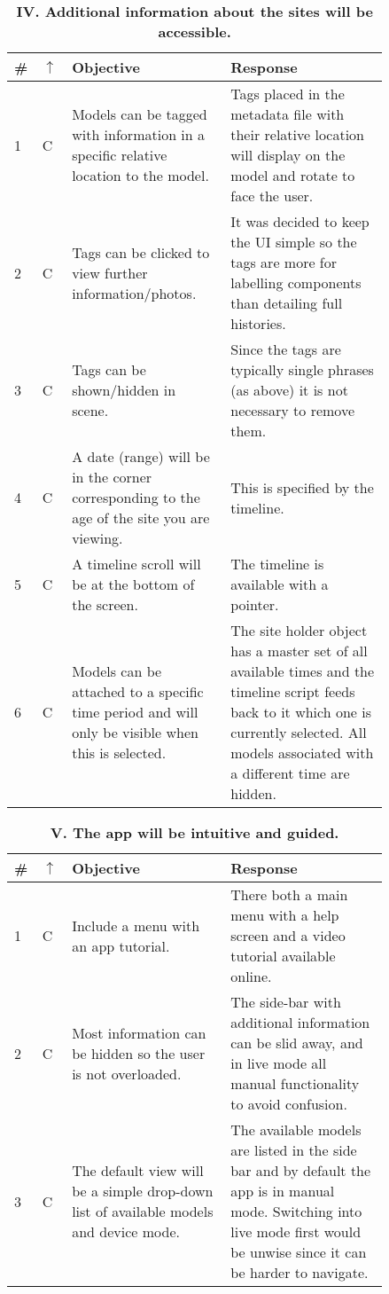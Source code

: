 \documentclass[12pt, a4paper]{article}
\newcommand{\done}[1]{\textcolor{brycedoesntlikegrey}{#1}}
\begin{document}
\newpage
\begin{table}[H]
\caption{\textbf{IV. Additional information about the sites will be accessible.}}
\begin{tabular}{| p{0.02\linewidth} | p{0.02\linewidth} | p{0.4\linewidth} | p{0.4\linewidth} | }
\hline
\textbf{\#} & \textbf{$\uparrow$} & \textbf{Objective} & \textbf{Response}
\\ \hline
1 & C & \done{Models can be tagged with information in a specific relative location to the model.} & Tags placed in the metadata file with their relative location will display on the model and rotate to face the user. \\ \hline
2 & C & Tags can be clicked to view further information/photos. & It was decided to keep the UI simple so the tags are more for labelling components than detailing full histories. \\ \hline
3 & C & Tags can be shown/hidden in scene. & Since the tags are typically single phrases (as above) it is not necessary to remove them. \\ \hline
4 & C & \done{A date (range) will be in the corner corresponding to the age of the site you are viewing.} & This is specified by the timeline. \\ \hline
5 & C & \done{A timeline scroll will be at the bottom of the screen.} & The timeline is available with a pointer. \\ \hline
6 & C & \done{Models can be attached to a specific time period and will only be visible when this is selected.} & The site holder object has a master set of all available times and the timeline script feeds back to it which one is currently selected. All models associated with a different time are hidden. \\ \hline
\end{tabular}
\label{table:obj4}
\end{table}

\begin{table}[H]
\caption{\textbf{V. The app will be intuitive and guided.}}
\begin{tabular}{| p{0.02\linewidth} | p{0.02\linewidth} | p{0.4\linewidth} | p{0.4\linewidth} | }
\hline
\textbf{\#} & \textbf{$\uparrow$} & \textbf{Objective} & \textbf{Response}
\\ \hline
1 & C & \done{Include a menu with an app tutorial.} & There both a main menu with a help screen and a video tutorial available online. \\ \hline
2 & C & \done{Most information can be hidden so the user is not overloaded.} & The side-bar with additional information can be slid away, and in live mode all manual functionality to avoid confusion. \\ \hline
3 & C & \done{The default view will be a simple drop-down list of available models and device mode.} & The available models are listed in the side bar and by default the app is in manual mode. Switching into live mode first would be unwise since it can be harder to navigate. \\ \hline
\end{tabular}
\label{table:obj5}
\end{table}
\end{document}
